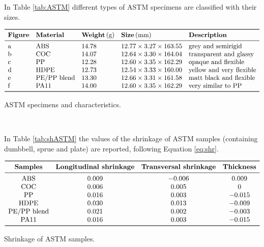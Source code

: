 \documentclass[a4paper, 11pt]{article}
\begin{document}
In Table \ref{tab:ASTM} different types of ASTM specimens are classified with their sizes.
\begin{table}[htp]
\centering
$
\begin{array}{lllll}
\toprule
\textbf{Figure} & \textbf{Material} & \textbf{Weight}\,(\text{g}) & \textbf{Size}\,(\text{mm}) & \textbf{Description} \\
\midrule
\text{a} & \text{ABS} & 14.78 & 12.77\times 3.27\times 163.55 & \text{grey and semirigid}\\
\text{b} & \text{COC} & 14.07 & 12.64\times 3.30\times 164.04 & \text{transparent and glassy}\\
\text{c} & \text{PP} & 12.28 & 12.60\times 3.35\times 162.29 & \text{opaque and flexible} \\
\text{d} & \text{HDPE} & 12.73 & 12.54\times 3.33\times 160.00 & \text{yellow and very flexible} \\
\text{e} & \text{PE/PP}\ \text{blend} & 13.30 & 12.66\times 3.31\times 161.58 & \text{matt black and flexible} \\
\text{f} & \text{PA11} & 14.00 & 12.60\times 3.35\times 162.29 & \text{very similar to PP} \\
\bottomrule
\end{array}
$
\caption{ASTM specimens and characteristics.}
\label{tab:ASTM}
\end{table}
\\

\newpage

In Table \ref{tab:shASTM} the values of the shrinkage of ASTM samples (containing dumbbell, sprue and plate) are reported, following Equation \ref{eq:shr}.

\begin{table}[htp]
\centering
$
\begin{array}{cccc}
\toprule
\textbf{Samples} & \textbf{Longitudinal shrinkage} & \textbf{Transversal shrinkage} & \textbf{Thickness} \\
\midrule
\text{ABS} & 0.009 & -0.006 & 0.009  \\
\text{COC} & 0.006 & 0.005 & 0 \\
\text{PP} & 0.016 & 0.003& -0.015 \\
\text{HDPE} & 0.030 & 0.013 & -0.009 \\
\text{PE/PP blend} & 0.021 & 0.002 & -0.003 \\
\text{PA11} & 0.016 & 0.003& -0.015 \\
\bottomrule
\end{array}
$
\caption{Shrinkage of ASTM samples.}
\label{tab:shASTM}
\end{table}
\end{document}
